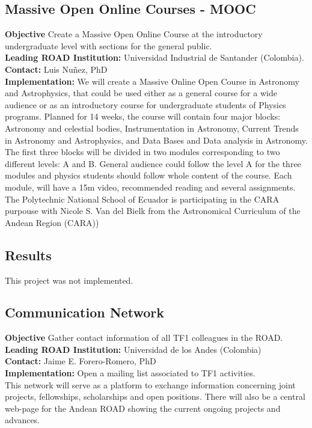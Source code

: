




\subsection{Massive Open Online Courses - MOOC}
\textbf{Objective} Create a Massive Open Online Course at the introductory undergraduate level with sections for the general public.
\\
\textbf{Leading ROAD Institution:} Universidad Industrial de Santander (Colombia).
\\
\textbf{Contact: }Luis Nuñez, PhD 
\\
\textbf{Implementation:} We will create a Massive Online Open Course in Astronomy and Astrophysics, that could be used either as a general course for a wide audience or as an introductory course for undergraduate students of Physics programs. Planned for 14 weeks, the course will contain four major blocks: Astronomy and celestial bodies, Instrumentation in Astronomy, Current Trends in Astronomy and Astrophysics, and Data Bases and Data analysis in Astronomy. The first three blocks will be divided in two modules corresponding to two different levels: A and B. General audience could follow the level A for the three modules and physics students should follow whole content of the course.
Each module, will have a 15m video, recommended reading and several assignments.
\\
The Polytechnic National School of Ecuador is participating in the CARA purpouse with Nicole S. Van del Bielk from the Astronomical Curriculum of the Andean Region (CARA))


\subsection{Results}

This project was not implemented.


\subsection{Communication Network}
\textbf{Objective} Gather contact information of all TF1 colleagues in the ROAD.
\\
\textbf{Leading ROAD Institution:} Universidad de los Andes (Colombia)
\\
\textbf{Contact:} Jaime E. Forero-Romero, PhD
\\
\textbf{Implementation:} Open a mailing list associated to TF1 activities.
\\
This network will serve as a platform to exchange information concerning joint projects, fellowships, scholarships and open positions. There will also be a central web-page for the Andean ROAD showing the current ongoing projects and advances.

